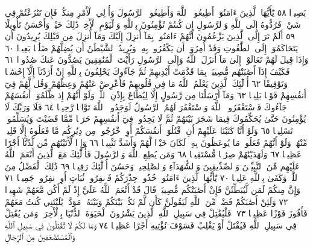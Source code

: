 بَصِيرࣰا ٥٨ يَٰٓأَيُّهَا ٱلَّذِينَ ءَامَنُوٓا۟ أَطِيعُوا۟ ٱللَّهَ وَأَطِيعُوا۟ ٱلرَّسُولَ وَأُو۟لِي
ٱلْأَمْرِ مِنكُمْۖ فَإِن تَنَٰزَعْتُمْ فِي شَيْءࣲ فَرُدُّوهُ إِلَى ٱللَّهِ وَٱلرَّسُولِ إِن كُنتُمْ
تُؤْمِنُونَ بِٱللَّهِ وَٱلْيَوْمِ ٱلْأٓخِرِۚ ذَٰلِكَ خَيْرࣱ وَأَحْسَنُ تَأْوِيلًا ٥٩
أَلَمْ تَرَ إِلَى ٱلَّذِينَ يَزْعُمُونَ أَنَّهُمْ ءَامَنُوا۟ بِمَآ أُنزِلَ إِلَيْكَ
وَمَآ أُنزِلَ مِن قَبْلِكَ يُرِيدُونَ أَن يَتَحَاكَمُوٓا۟ إِلَى ٱلطَّٰغُوتِ
وَقَدْ أُمِرُوٓا۟ أَن يَكْفُرُوا۟ بِهِۦۖ وَيُرِيدُ ٱلشَّيْطَٰنُ أَن يُضِلَّهُمْ
ضَلَٰلَۢا بَعِيدࣰا ٦٠ وَإِذَا قِيلَ لَهُمْ تَعَالَوْا۟ إِلَىٰ مَآ أَنزَلَ
ٱللَّهُ وَإِلَى ٱلرَّسُولِ رَأَيْتَ ٱلْمُنَٰفِقِينَ يَصُدُّونَ عَنكَ
صُدُودࣰا ٦١ فَكَيْفَ إِذَآ أَصَٰبَتْهُم مُّصِيبَةُۢ بِمَا
قَدَّمَتْ أَيْدِيهِمْ ثُمَّ جَآءُوكَ يَحْلِفُونَ بِٱللَّهِ إِنْ أَرَدْنَآ إِلَّآ
إِحْسَٰنࣰا وَتَوْفِيقًا ٦٢ أُو۟لَٰٓئِكَ ٱلَّذِينَ يَعْلَمُ ٱللَّهُ مَا
فِي قُلُوبِهِمْ فَأَعْرِضْ عَنْهُمْ وَعِظْهُمْ وَقُل لَّهُمْ فِيٓ
أَنفُسِهِمْ قَوْلَۢا بَلِيغࣰا ٦٣ وَمَآ أَرْسَلْنَا مِن رَّسُولٍ إِلَّا
لِيُطَاعَ بِإِذْنِ ٱللَّهِۚ وَلَوْ أَنَّهُمْ إِذ ظَّلَمُوٓا۟ أَنفُسَهُمْ
جَآءُوكَ فَٱسْتَغْفَرُوا۟ ٱللَّهَ وَٱسْتَغْفَرَ لَهُمُ ٱلرَّسُولُ
لَوَجَدُوا۟ ٱللَّهَ تَوَّابࣰا رَّحِيمࣰا ٦٤ فَلَا وَرَبِّكَ لَا يُؤْمِنُونَ
حَتَّىٰ يُحَكِّمُوكَ فِيمَا شَجَرَ بَيْنَهُمْ ثُمَّ لَا يَجِدُوا۟ فِيٓ
أَنفُسِهِمْ حَرَجࣰا مِّمَّا قَضَيْتَ وَيُسَلِّمُوا۟ تَسْلِيمࣰا ٦٥
وَلَوْ أَنَّا كَتَبْنَا عَلَيْهِمْ أَنِ ٱقْتُلُوٓا۟ أَنفُسَكُمْ أَوِ ٱخْرُجُوا۟ مِن
دِيَٰرِكُم مَّا فَعَلُوهُ إِلَّا قَلِيلࣱ مِّنْهُمْۖ وَلَوْ أَنَّهُمْ فَعَلُوا۟ مَا يُوعَظُونَ
بِهِۦ لَكَانَ خَيْرࣰا لَّهُمْ وَأَشَدَّ تَثْبِيتࣰا ٦٦ وَإِذࣰا لَّأٓتَيْنَٰهُم
مِّن لَّدُنَّآ أَجْرًا عَظِيمࣰا ٦٧ وَلَهَدَيْنَٰهُمْ صِرَٰطࣰا مُّسْتَقِيمࣰا ٦٨
وَمَن يُطِعِ ٱللَّهَ وَٱلرَّسُولَ فَأُو۟لَٰٓئِكَ مَعَ ٱلَّذِينَ أَنْعَمَ ٱللَّهُ
عَلَيْهِم مِّنَ ٱلنَّبِيِّـۧنَ وَٱلصِّدِّيقِينَ وَٱلشُّهَدَآءِ وَٱلصَّٰلِحِينَۚ
وَحَسُنَ أُو۟لَٰٓئِكَ رَفِيقࣰا ٦٩ ذَٰلِكَ ٱلْفَضْلُ مِنَ ٱللَّهِۚ وَكَفَىٰ
بِٱللَّهِ عَلِيمࣰا ٧٠ يَٰٓأَيُّهَا ٱلَّذِينَ ءَامَنُوا۟ خُذُوا۟ حِذْرَكُمْ
فَٱنفِرُوا۟ ثُبَاتٍ أَوِ ٱنفِرُوا۟ جَمِيعࣰا ٧١ وَإِنَّ مِنكُمْ لَمَن لَّيُبَطِّئَنَّ
فَإِنْ أَصَٰبَتْكُم مُّصِيبَةࣱ قَالَ قَدْ أَنْعَمَ ٱللَّهُ عَلَيَّ إِذْ لَمْ أَكُن
مَّعَهُمْ شَهِيدࣰا ٧٢ وَلَئِنْ أَصَٰبَكُمْ فَضْلࣱ مِّنَ ٱللَّهِ لَيَقُولَنَّ كَأَن
لَّمْ تَكُنۢ بَيْنَكُمْ وَبَيْنَهُۥ مَوَدَّةࣱ يَٰلَيْتَنِي كُنتُ مَعَهُمْ
فَأَفُوزَ فَوْزًا عَظِيمࣰا ٧٣۞ فَلْيُقَٰتِلْ فِي سَبِيلِ ٱللَّهِ ٱلَّذِينَ
يَشْرُونَ ٱلْحَيَوٰةَ ٱلدُّنْيَا بِٱلْأٓخِرَةِۚ وَمَن يُقَٰتِلْ فِي سَبِيلِ
ٱللَّهِ فَيُقْتَلْ أَوْ يَغْلِبْ فَسَوْفَ نُؤْتِيهِ أَجْرًا عَظِيمࣰا ٧٤
وَمَا لَكُمْ لَا تُقَٰتِلُونَ فِي سَبِيلِ ٱللَّهِ وَٱلْمُسْتَضْعَفِينَ مِنَ ٱلرِّجَالِ
